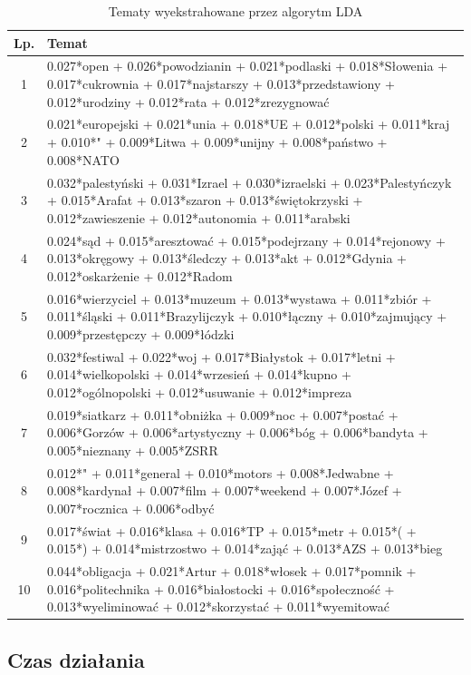 \documentclass[11pt,a4paper]{article}
\begin{document}
\begin{table}[h]
\label{fig:lda_topics}
\caption{Tematy wyekstrahowane przez algorytm LDA}
\begin{tabular}{|c|p{\linewidth}|}
\hline
Lp. & Temat \\\hline
1 & 0.027*open + 0.026*powodzianin + 0.021*podlaski + 0.018*Słowenia + 0.017*cukrownia + 0.017*najstarszy + 0.013*przedstawiony + 0.012*urodziny + 0.012*rata + 0.012*zrezygnować\\\hline
2 & 0.021*europejski + 0.021*unia + 0.018*UE + 0.012*polski + 0.011*kraj + 0.010*" + 0.009*Litwa + 0.009*unijny + 0.008*państwo + 0.008*NATO\\\hline
3 & 0.032*palestyński + 0.031*Izrael + 0.030*izraelski + 0.023*Palestyńczyk + 0.015*Arafat + 0.013*szaron + 0.013*świętokrzyski + 0.012*zawieszenie + 0.012*autonomia + 0.011*arabski\\\hline
4 & 0.024*sąd + 0.015*aresztować + 0.015*podejrzany + 0.014*rejonowy + 0.013*okręgowy + 0.013*śledczy + 0.013*akt + 0.012*Gdynia + 0.012*oskarżenie + 0.012*Radom\\\hline
5 & 0.016*wierzyciel + 0.013*muzeum + 0.013*wystawa + 0.011*zbiór + 0.011*śląski + 0.011*Brazylijczyk + 0.010*łączny + 0.010*zajmujący + 0.009*przestępczy + 0.009*łódzki\\\hline
6 & 0.032*festiwal + 0.022*woj + 0.017*Białystok + 0.017*letni + 0.014*wielkopolski + 0.014*wrzesień + 0.014*kupno + 0.012*ogólnopolski + 0.012*usuwanie + 0.012*impreza\\\hline
7 & 0.019*siatkarz + 0.011*obniżka + 0.009*noc + 0.007*postać + 0.006*Gorzów + 0.006*artystyczny + 0.006*bóg + 0.006*bandyta + 0.005*nieznany + 0.005*ZSRR\\\hline
8 & 0.012*" + 0.011*general + 0.010*motors + 0.008*Jedwabne + 0.008*kardynał + 0.007*film + 0.007*weekend + 0.007*Józef + 0.007*rocznica + 0.006*odbyć\\\hline
9 & 0.017*świat + 0.016*klasa + 0.016*TP + 0.015*metr + 0.015*( + 0.015*) + 0.014*mistrzostwo + 0.014*zająć + 0.013*AZS + 0.013*bieg\\\hline
10 & 0.044*obligacja + 0.021*Artur + 0.018*włosek + 0.017*pomnik + 0.016*politechnika + 0.016*białostocki + 0.016*społeczność + 0.013*wyeliminować + 0.012*skorzystać + 0.011*wyemitować\\\hline
\end{tabular}
\end{table}

\FloatBarrier

\subsection{Czas działania}
\end{document}

